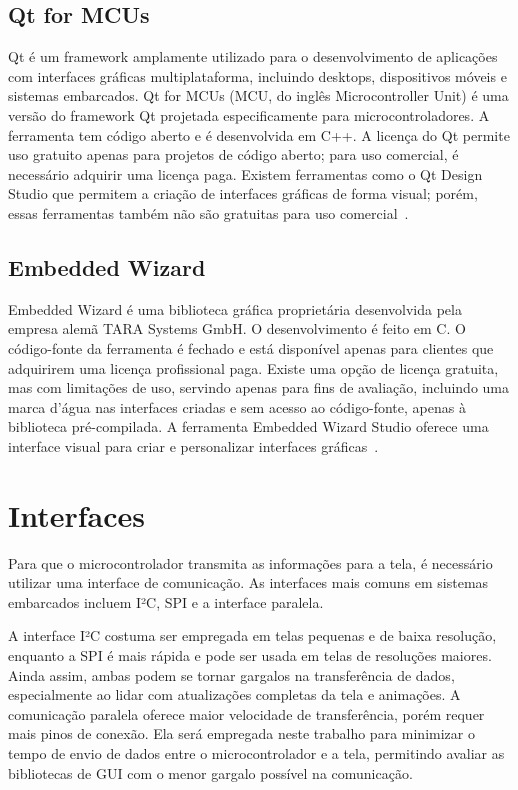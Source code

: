 \subsection{Qt for MCUs}
Qt é um framework amplamente utilizado para o desenvolvimento de aplicações com interfaces gráficas multiplataforma, incluindo desktops, dispositivos móveis e sistemas embarcados. Qt for MCUs (MCU, do inglês Microcontroller Unit) é uma versão do framework Qt projetada especificamente para microcontroladores. A ferramenta tem código aberto e é desenvolvida em C++. A licença do Qt permite uso gratuito apenas para projetos de código aberto; para uso comercial, é necessário adquirir uma licença paga. Existem ferramentas como o Qt Design Studio que permitem a criação de interfaces gráficas de forma visual; porém, essas ferramentas também não são gratuitas para uso comercial~\cite{qt-embedded-docs}.

\subsection{Embedded Wizard}
Embedded Wizard é uma biblioteca gráfica proprietária desenvolvida pela empresa alemã TARA Systems GmbH. O desenvolvimento é feito em C. O código-fonte da ferramenta é fechado e está disponível apenas para clientes que adquirirem uma licença profissional paga. Existe uma opção de licença gratuita, mas com limitações de uso, servindo apenas para fins de avaliação, incluindo uma marca d'água nas interfaces criadas e sem acesso ao código-fonte, apenas à biblioteca pré-compilada. A ferramenta Embedded Wizard Studio oferece uma interface visual para criar e personalizar interfaces gráficas~\cite{embedded-wizard-st-platforms}.

\section{Interfaces}
Para que o microcontrolador transmita as informações para a tela, é necessário utilizar uma interface de comunicação. As interfaces mais comuns em sistemas embarcados incluem I²C, SPI e a interface paralela. 

A interface I²C costuma ser empregada em telas pequenas e de baixa resolução, enquanto a SPI é mais rápida e pode ser usada em telas de resoluções maiores. Ainda assim, ambas podem se tornar gargalos na transferência de dados, especialmente ao lidar com atualizações completas da tela e animações. A comunicação paralela oferece maior velocidade de transferência, porém requer mais pinos de conexão. Ela será empregada neste trabalho para minimizar o tempo de envio de dados entre o microcontrolador e a tela, permitindo avaliar as bibliotecas de GUI com o menor gargalo possível na comunicação.

